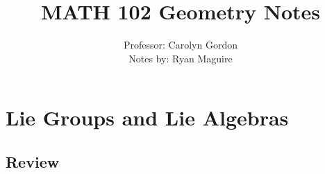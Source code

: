 \documentclass{book}                                                            %
\begin{document}
    \title{MATH 102 Geometry Notes}
    \author{%
        Professor: Carolyn Gordon\\
        Notes by: Ryan Maguire%
    }
    \date{\vspace{-5ex}}
    \maketitle
    \tableofcontents
    \listoffigures
    \chapter{Lie Groups and Lie Algebras}
        \section{Review}
\end{document}
